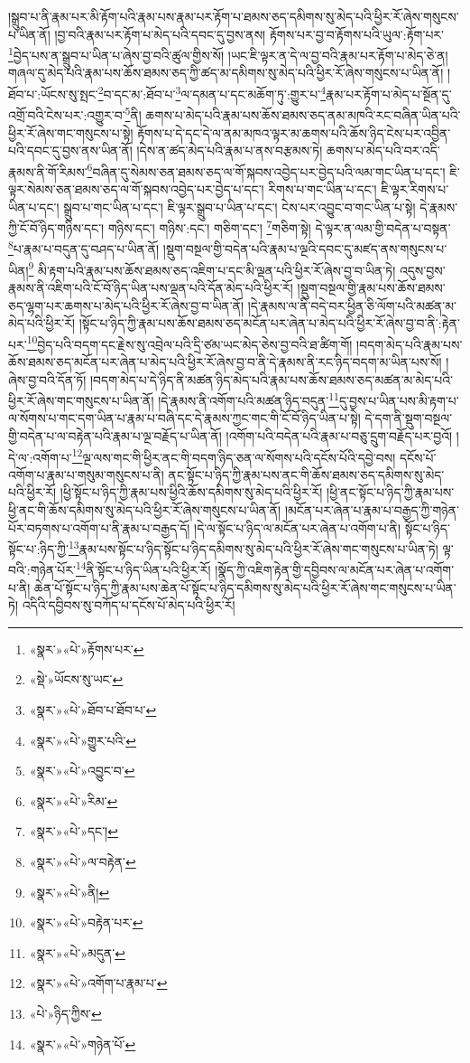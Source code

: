 །སྒྲུབ་པ་ནི་རྣམ་པར་མི་རྟོག་པའི་རྣམ་པས་རྣམ་པར་རྟོག་པ་ཐམས་ཅད་དམིགས་སུ་མེད་པའི་ཕྱིར་རོ་ཞེས་གསུངས་པ་ཡིན་ནོ། །བྱ་བའི་རྣམ་པར་རྟོག་པ་མེད་པའི་དབང་དུ་བྱས་ནས། རྟོགས་པར་བྱ་བ་རྟོགས་པའི་ཡུལ་:རྟོག་པར་\footnote{«སྣར་»«པེ་»རྟོགས་པར་}བྱེད་པས་ན་སྒྲུབ་པ་ཡིན་པ་ཞེས་བྱ་བའི་ཚུལ་གྱིས་སོ། །ཡང་ཇི་ལྟར་ན་དེ་ལ་བྱ་བའི་རྣམ་པར་རྟོག་པ་མེད་ཅེ་ན། གཞལ་དུ་མེད་པའི་རྣམ་པས་ཆོས་ཐམས་ཅད་ཀྱི་ཚད་མ་དམིགས་སུ་མེད་པའི་ཕྱིར་རོ་ཞེས་གསུངས་པ་ཡིན་ནོ། །ཐོབ་པ་:ཡོངས་སུ་སྤང་\footnote{«སྡེ་»ཡོངས་སུ་ཡང་}བ་དང་མ་:ཐོབ་པ་\footnote{«སྣར་»«པེ་»ཐོབ་པ་ཐོབ་པ་}ལ་དམན་པ་དང་མཆོག་ཏུ་:གྱུར་པ་\footnote{«སྣར་»«པེ་»གྱུར་པའི་}རྣམ་པར་རྟོག་པ་མེད་པ་སྔོན་དུ་འགྲོ་བའི་ངེས་པར་:འགྱུར་བ་\footnote{«སྣར་»«པེ་»འབྱུང་བ་}ནི། ཆགས་པ་མེད་པའི་རྣམ་པས་ཆོས་ཐམས་ཅད་ནམ་མཁའི་རང་བཞིན་ཡིན་པའི་ཕྱིར་རོ་ཞེས་གང་གསུངས་པ་སྟེ། རྟོགས་པ་དེ་དང་དེ་ལ་ནམ་མཁའ་ལྟར་མ་ཆགས་པའི་ཆོས་ཉིད་ངེས་པར་འབྱིན་པའི་དབང་དུ་བྱས་ནས་ཡིན་ནོ། །དེས་ན་ཚད་མེད་པའི་རྣམ་པ་ནས་བརྩམས་ཏེ། ཆགས་པ་མེད་པའི་བར་འདི་རྣམས་ནི་གོ་རིམས་\footnote{«སྣར་»«པེ་»རིམ་}བཞིན་དུ་སེམས་ཅན་ཐམས་ཅད་ལ་གོ་སྐབས་འབྱེད་པར་བྱེད་པའི་ལམ་གང་ཡིན་པ་དང་། ཇི་ལྟར་སེམས་ཅན་ཐམས་ཅད་ལ་གོ་སྐབས་འབྱེད་པར་བྱེད་པ་དང་། རིགས་པ་གང་ཡིན་པ་དང་། ཇི་ལྟར་རིགས་པ་ཡིན་པ་དང་། སྒྲུབ་པ་གང་ཡིན་པ་དང་། ཇི་ལྟར་སྒྲུབ་པ་ཡིན་པ་དང་། ངེས་པར་འབྱུང་བ་གང་ཡིན་པ་སྟེ། དེ་རྣམས་ཀྱི་ངོ་བོ་ཉིད་གཉིས་དང་། གཉིས་དང་། གཉིས་:དང་། གཅིག་དང་། \footnote{«སྣར་»«པེ་»དང་།  }གཅིག་སྟེ། དེ་ལྟར་ན་ལམ་གྱི་བདེན་པ་བསྟན་\footnote{«སྣར་»«པེ་»ལ་བརྟེན་}པ་རྣམ་པ་བདུན་དུ་བཤད་པ་ཡིན་ནོ། །སྡུག་བསྔལ་གྱི་བདེན་པའི་རྣམ་པ་ལྔའི་དབང་དུ་མཛད་ནས་གསུངས་པ་ཡིན།\footnote{«སྣར་»«པེ་»ནི།} མི་རྟག་པའི་རྣམ་པས་ཆོས་ཐམས་ཅད་འཇིག་པ་དང་མི་ལྡན་པའི་ཕྱིར་རོ་ཞེས་བྱ་བ་ཡིན་ཏེ། འདུས་བྱས་རྣམས་ནི་འཇིག་པའི་ངོ་བོ་ཉིད་ཡིན་པས་ལྡན་པའི་དོན་མེད་པའི་ཕྱིར་རོ། །སྡུག་བསྔལ་གྱི་རྣམ་པས་ཆོས་ཐམས་ཅད་ལྷག་པར་ཆགས་པ་མེད་པའི་ཕྱིར་རོ་ཞེས་བྱ་བ་ཡིན་ནོ། །དེ་རྣམས་ལ་ནི་བདེ་བར་ཕྱིན་ཅི་ལོག་པའི་མཚན་མ་མེད་པའི་ཕྱིར་རོ། །སྟོང་པ་ཉིད་ཀྱི་རྣམ་པས་ཆོས་ཐམས་ཅད་མངོན་པར་ཞེན་པ་མེད་པའི་ཕྱིར་རོ་ཞེས་བྱ་བ་ནི་:རྟེན་པར་\footnote{«སྣར་»«པེ་»བརྟེན་པར་}བྱེད་པའི་བདག་དང་རྗེས་སུ་འབྲེལ་པའི་དྲི་ཙམ་ཡང་མེད་ཅེས་བྱ་བའི་ཐ་ཚིག་གོ། །བདག་མེད་པའི་རྣམ་པས་ཆོས་ཐམས་ཅད་མངོན་པར་ཞེན་པ་མེད་པའི་ཕྱིར་རོ་ཞེས་བྱ་བ་ནི་དེ་རྣམས་ནི་རང་ཉིད་བདག་མ་ཡིན་པས་སོ། །ཞེས་བྱ་བའི་དོན་ཏོ། །བདག་མེད་པ་དེ་ཉིད་ནི་མཚན་ཉིད་མེད་པའི་རྣམ་པས་ཆོས་ཐམས་ཅད་མཚན་མ་མེད་པའི་ཕྱིར་རོ་ཞེས་གང་གསུངས་པ་ཡིན་ནོ། །དེ་རྣམས་ནི་འགོག་པའི་མཚན་ཉིད་བདུན་\footnote{«སྣར་»«པེ་»མདུན་}དུ་བྱས་པ་ཡིན་པས་མི་རྟག་པ་ལ་སོགས་པ་གང་དག་ཡིན་པ་རྣམ་པ་བཞི་དང་དེ་རྣམས་ཀྱང་གང་གི་ངོ་བོ་ཉིད་ཡིན་པ་སྟེ། དེ་དག་ནི་སྡུག་བསྔལ་གྱི་བདེན་པ་ལ་བརྟེན་པའི་རྣམ་པ་ལྔ་བརྗོད་པ་ཡིན་ནོ། །འགོག་པའི་བདེན་པའི་རྣམ་པ་བཅུ་དྲུག་བརྗོད་པར་བྱའོ། །དེ་ལ་:འགོག་པ་\footnote{«སྣར་»«པེ་»འགོག་པ་རྣམ་པ་}ལྔ་ལས་གང་གི་ཕྱིར་ནང་གི་བདག་ཉིད་ཅན་ལ་སོགས་པའི་དངོས་པོའི་དབྱེ་བས། དངོས་པོ་འགོག་པ་རྣམ་པ་གསུམ་གསུངས་པ་ནི། ནང་སྟོང་པ་ཉིད་ཀྱི་རྣམ་པས་ནང་གི་ཆོས་ཐམས་ཅད་དམིགས་སུ་མེད་པའི་ཕྱིར་རོ། །ཕྱི་སྟོང་པ་ཉིད་ཀྱི་རྣམ་པས་ཕྱིའི་ཆོས་དམིགས་སུ་མེད་པའི་ཕྱིར་རོ། །ཕྱི་ནང་སྟོང་པ་ཉིད་ཀྱི་རྣམ་པས་ཕྱི་ནང་གི་ཆོས་དམིགས་སུ་མེད་པའི་ཕྱིར་རོ་ཞེས་གསུངས་པ་ཡིན་ནོ། །མངོན་པར་ཞེན་པ་རྣམ་པ་བརྒྱད་ཀྱི་གཉེན་པོར་བཏགས་པ་འགོག་པ་ནི་རྣམ་པ་བརྒྱད་དོ། །དེ་ལ་སྟོང་པ་ཉིད་ལ་མངོན་པར་ཞེན་པ་འགོག་པ་ནི། སྟོང་པ་ཉིད་སྟོང་པ་:ཉིད་ཀྱི་\footnote{«པེ་»ཉིད་ཀྱིས་}རྣམ་པས་སྟོང་པ་ཉིད་སྟོང་པ་ཉིད་དམིགས་སུ་མེད་པའི་ཕྱིར་རོ་ཞེས་གང་གསུངས་པ་ཡིན་ཏེ། ལྟ་བའི་:གཉེན་པོར་\footnote{«སྣར་»«པེ་»གཉེན་པོ་}ནི་སྟོང་པ་ཉིད་ཡིན་པའི་ཕྱིར་རོ། །སྣོད་ཀྱི་འཇིག་རྟེན་གྱི་དབྱིབས་ལ་མངོན་པར་ཞེན་པ་འགོག་པ་ནི། ཆེན་པོ་སྟོང་པ་ཉིད་ཀྱི་རྣམ་པས་ཆེན་པོ་སྟོང་པ་ཉིད་དམིགས་སུ་མེད་པའི་ཕྱིར་རོ་ཞེས་གང་གསུངས་པ་ཡིན་ཏེ། འདིའི་དབྱིབས་སུ་བཀོད་པ་དངོས་པོ་མེད་པའི་ཕྱིར་རོ། 